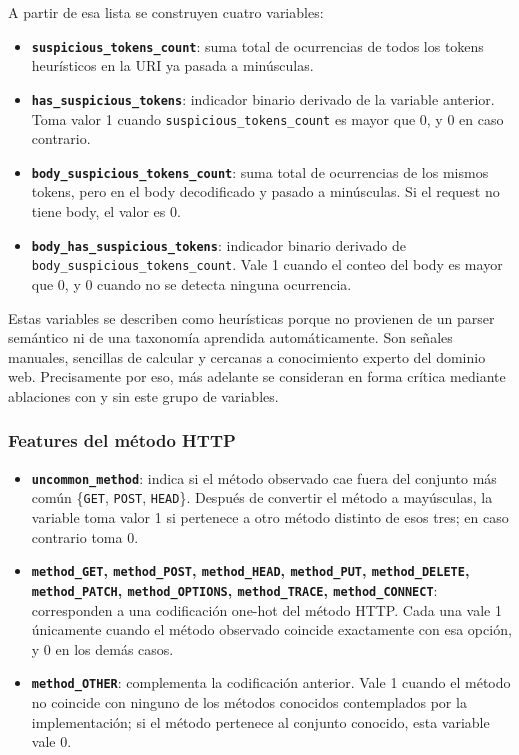 \documentclass[12pt,oneside]{report}
\begin{document}
A partir de esa lista se construyen cuatro variables:

\begin{itemize}[leftmargin=*]
  \item \textbf{\texttt{suspicious\_tokens\_count}}: suma total de ocurrencias de todos los tokens heurísticos en la URI ya pasada a minúsculas.

  \item \textbf{\texttt{has\_suspicious\_tokens}}: indicador binario derivado de la variable anterior. Toma valor 1 cuando \texttt{suspicious\_tokens\_count} es mayor que 0, y 0 en caso contrario.

  \item \textbf{\texttt{body\_suspicious\_tokens\_count}}: suma total de ocurrencias de los mismos tokens, pero en el body decodificado y pasado a minúsculas. Si el request no tiene body, el valor es 0.

  \item \textbf{\texttt{body\_has\_suspicious\_tokens}}: indicador binario derivado de \texttt{body\_suspicious\_tokens\_count}. Vale 1 cuando el conteo del body es mayor que 0, y 0 cuando no se detecta ninguna ocurrencia.
\end{itemize}

Estas variables se describen como heurísticas porque no provienen de un parser semántico ni de una taxonomía aprendida automáticamente. Son señales manuales, sencillas de calcular y cercanas a conocimiento experto del dominio web. Precisamente por eso, más adelante se consideran en forma crítica mediante ablaciones con y sin este grupo de variables.

\subsubsection{Features del método HTTP}
\begin{itemize}[leftmargin=*]
  \item \textbf{\texttt{uncommon\_method}}: indica si el método observado cae fuera del conjunto más común \{\texttt{GET}, \texttt{POST}, \texttt{HEAD}\}. Después de convertir el método a mayúsculas, la variable toma valor 1 si pertenece a otro método distinto de esos tres; en caso contrario toma 0.

  \item \textbf{\texttt{method\_GET}, \texttt{method\_POST}, \texttt{method\_HEAD}, \texttt{method\_PUT}, \texttt{method\_DELETE}, \texttt{method\_PATCH}, \texttt{method\_OPTIONS}, \texttt{method\_TRACE}, \texttt{method\_CONNECT}}: corresponden a una codificación one-hot del método HTTP. Cada una vale 1 únicamente cuando el método observado coincide exactamente con esa opción, y 0 en los demás casos.

  \item \textbf{\texttt{method\_OTHER}}: complementa la codificación anterior. Vale 1 cuando el método no coincide con ninguno de los métodos conocidos contemplados por la implementación; si el método pertenece al conjunto conocido, esta variable vale 0.
\end{itemize}
\end{document}

